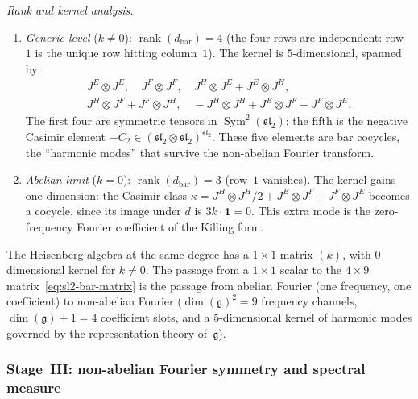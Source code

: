 \begin{example}
\emph{Rank and kernel analysis.}
\begin{enumerate}[label=\textup{(\roman*)}]
\item \emph{Generic level} ($k \neq 0$):
 $\operatorname{rank}(d_{\mathrm{bar}}) = 4$
 (the four rows are independent: row~$1$ is the unique row
 hitting column~$1$). The kernel is
 $5$-dimensional, spanned by:
 \begin{gather*}
 J^E \otimes J^E, \quad
 J^F \otimes J^F, \quad
 J^H \otimes J^E + J^E \otimes J^H, \\
 J^H \otimes J^F + J^F \otimes J^H, \quad
 -J^H \otimes J^H + J^E \otimes J^F + J^F \otimes J^E.
 \end{gather*}
 The first four are symmetric tensors in $\operatorname{Sym}^2(\mathfrak{sl}_2)$; the
 fifth is the negative Casimir element $-C_2 \in
 (\mathfrak{sl}_2 \otimes \mathfrak{sl}_2)^{\mathfrak{sl}_2}$.
 These five elements are bar cocycles, the ``harmonic modes''
 that survive the non-abelian Fourier transform.

\item \emph{Abelian limit} ($k = 0$):
 $\operatorname{rank}(d_{\mathrm{bar}}) = 3$ (row~$1$ vanishes).
 The kernel gains one dimension: the Casimir class
 $\kappa = J^H \otimes J^H / 2 + J^E \otimes J^F + J^F \otimes J^E$
 becomes a cocycle, since its image under $d$ is
 $3k \cdot \mathbf{1} = 0$. This extra mode is the
 zero-frequency Fourier coefficient of the Killing form.
\end{enumerate}
The Heisenberg algebra at the same degree has a $1 \times 1$ matrix
$(k)$, with $0$-dimensional kernel for $k \neq 0$. The passage from
a $1 \times 1$ scalar to the $4 \times 9$
matrix~\eqref{eq:sl2-bar-matrix} is the passage from abelian Fourier
(one frequency, one coefficient) to non-abelian Fourier ($\dim(\mathfrak{g})^2 = 9$ frequency channels, $\dim(\mathfrak{g}) + 1 = 4$
coefficient slots, and a $5$-dimensional kernel of harmonic modes
governed by the representation theory of~$\mathfrak{g}$).
\end{example}

\subsubsection{Stage~III: non-abelian Fourier symmetry and spectral
 measure}

